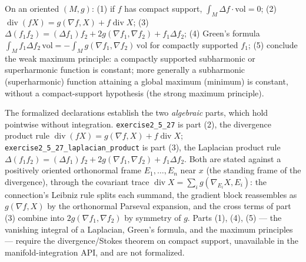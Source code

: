 \begin{remark}
  \label{rem:pet-ch2-ex-27}
  \leanok
  On an oriented $(M,g)$: (1) if $f$ has compact support,
  $\int_M\Delta f\cdot\mathrm{vol}=0$; (2)
  $\operatorname{div}(fX)=g(\nabla f,X)+f\operatorname{div}X$; (3)
  $\Delta(f_1f_2)=(\Delta f_1)f_2+2g(\nabla f_1,\nabla f_2)+f_1\Delta f_2$; (4)
  Green's formula
  $\int_Mf_1\Delta f_2\,\mathrm{vol}=-\int_Mg(\nabla f_1,\nabla f_2)\,\mathrm{vol}$
  for compactly supported $f_1$; (5) conclude the weak maximum principle: a
  compactly supported subharmonic or superharmonic function is constant; more
  generally a subharmonic (superharmonic) function attaining a global maximum
  (minimum) is constant, without a compact-support hypothesis (the strong
  maximum principle).

  The formalized declarations establish the two \emph{algebraic} parts, which
  hold pointwise without integration. \texttt{exercise2\_5\_27} is part (2), the
  divergence product rule $\operatorname{div}(fX)=g(\nabla f,X)+f\operatorname{div}X$;
  \texttt{exercise2\_5\_27\_laplacian\_product} is part (3), the Laplacian product
  rule $\Delta(f_1f_2)=(\Delta f_1)f_2+2g(\nabla f_1,\nabla f_2)+f_1\Delta f_2$.
  Both are stated against a positively oriented orthonormal frame $E_1,\dots,E_n$
  near $x$ (the standing frame of the divergence), through the covariant trace
  $\operatorname{div}X=\sum_ig(\nabla_{E_i}X,E_i)$: the connection's Leibniz rule
  splits each summand, the gradient block reassembles as $g(\nabla f,X)$ by the
  orthonormal Parseval expansion, and the cross terms of part (3) combine into
  $2g(\nabla f_1,\nabla f_2)$ by symmetry of $g$. Parts (1), (4), (5) — the
  vanishing integral of a Laplacian, Green's formula, and the maximum principles —
  require the divergence/Stokes theorem on compact support, unavailable in the
  manifold-integration API, and are not formalized.
\end{remark}

